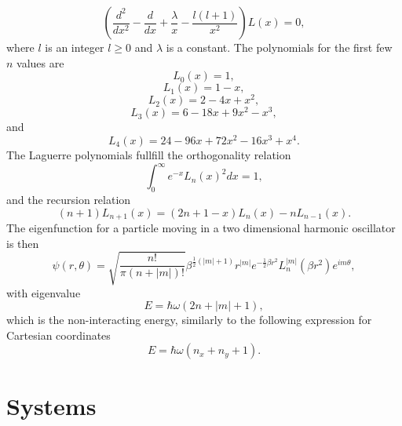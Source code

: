 \documentclass[../main.tex]{subfiles}
\begin{document}
\begin{equation}
    \left( \frac{d^2}{dx^2} - \frac{d}{dx} + \frac{\lambda}{x} - \frac{l(l+1)}{x^2} \right) L(x) = 0,
\end{equation}
where $l$ is an integer $l \geq 0$ and $\lambda$ is a constant. The polynomials for the first few $n$ values are
\begin{equation}
    L_0(x) = 1,
\end{equation}
\begin{equation}
    L_1(x) = 1-x,
\end{equation}
\begin{equation}
    L_2(x) = 2 - 4x + x^2,
\end{equation}
\begin{equation}
    L_3(x) = 6 - 18x + 9x^2 - x^3,
\end{equation}
and
\begin{equation}
    L_4(x) = 24 - 96x + 72x^2 -16x^3 + x^4.
\end{equation}
The Laguerre polynomials fullfill the orthogonality relation 
\begin{equation}
    \int_0^\infty e^{-x} L_n(x)^2 dx = 1,
\end{equation}
and the recursion relation 
\begin{equation}
    (n+1) L_{n+1}(x) = (2n + 1 - x) L_n(x) - n L_{n-1}(x).
\end{equation}
The eigenfunction for a particle moving in a two dimensional harmonic oscillator is then 
\begin{equation}
    \psi(r, \theta) = \sqrt{\frac{n!}{\pi (n + |m|)!}} \beta^{\frac{1}{2}(|m|+1)} r^{|m|} e^{-\frac{1}{2}\beta r^2} L_n^{|m|}(\beta r^2) e^{im\theta},
\end{equation}
with eigenvalue 
\begin{equation}
    E = \hbar \omega (2n + |m| + 1),
\end{equation}
which is the non-interacting energy, similarly to the following expression for Cartesian coordinates 
\begin{equation}
    E = \hbar \omega (n_x + n_y + 1).
\end{equation}


\section{Systems}
\end{document}
